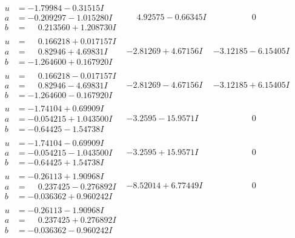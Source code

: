 \documentclass[1p]{elsarticle_modified}
\theoremstyle{definition}
\begin{document}
$$\begin{array}{c|c|c}
 \hline 
\begin{aligned}
u &= -1.79984 - 0.31515 I \\
a &= -0.209297 - 1.015280 I \\
b &= \phantom{-}0.213560 + 1.208730 I\end{aligned}
 & \phantom{-}4.92575 - 0.66345 I & \phantom{-0.000000 } 0 \\ \hline\begin{aligned}
u &= \phantom{-}0.166218 + 0.017157 I \\
a &= \phantom{-}0.82946 + 4.69831 I \\
b &= -1.264600 + 0.167920 I\end{aligned}
 & -2.81269 + 4.67156 I & -3.12185 - 6.15405 I \\ \hline\begin{aligned}
u &= \phantom{-}0.166218 - 0.017157 I \\
a &= \phantom{-}0.82946 - 4.69831 I \\
b &= -1.264600 - 0.167920 I\end{aligned}
 & -2.81269 - 4.67156 I & -3.12185 + 6.15405 I \\ \hline\begin{aligned}
u &= -1.74104 + 0.69909 I \\
a &= -0.054215 + 1.043500 I \\
b &= -0.64425 - 1.54738 I\end{aligned}
 & -3.2595 - 15.9571 I & \phantom{-0.000000 } 0 \\ \hline\begin{aligned}
u &= -1.74104 - 0.69909 I \\
a &= -0.054215 - 1.043500 I \\
b &= -0.64425 + 1.54738 I\end{aligned}
 & -3.2595 + 15.9571 I & \phantom{-0.000000 } 0 \\ \hline\begin{aligned}
u &= -0.26113 + 1.90968 I \\
a &= \phantom{-}0.237425 - 0.276892 I \\
b &= -0.036362 + 0.960242 I\end{aligned}
 & -8.52014 + 6.77449 I & \phantom{-0.000000 } 0 \\ \hline\begin{aligned}
u &= -0.26113 - 1.90968 I \\
a &= \phantom{-}0.237425 + 0.276892 I \\
b &= -0.036362 - 0.960242 I\end{aligned}

\end{array}$$
\end{document}
